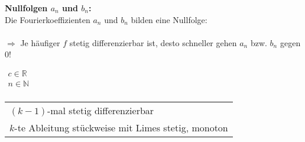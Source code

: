 				\textbf{Nullfolgen $a_n$ und $b_n$:}\\[3pt]
				Die Fourierkoeffizienten $a_n$ und $b_n$ bilden eine Nullfolge:\\[3pt]
				\\[3pt]
				$\Rightarrow$ Je häufiger $f$ stetig differenzierbar ist, desto schneller gehen $a_n$ bzw. $b_n$ gegen $0$!\\[3pt]
				\begin{minipage}[t]{0.5\textwidth}
					$\begin{array}{l}
						c \in \mathbb{R}\\
						n \in \mathbb{N}\\
					\end{array}$
				\end{minipage}
				\begin{minipage}[t]{0.5\textwidth}
					\begin{tabular}{l}
						$(k - 1)$-mal stetig differenzierbar\\
						$k$-te Ableitung stückweise mit Limes stetig, monoton\\
					\end{tabular}
				\end{minipage}
				